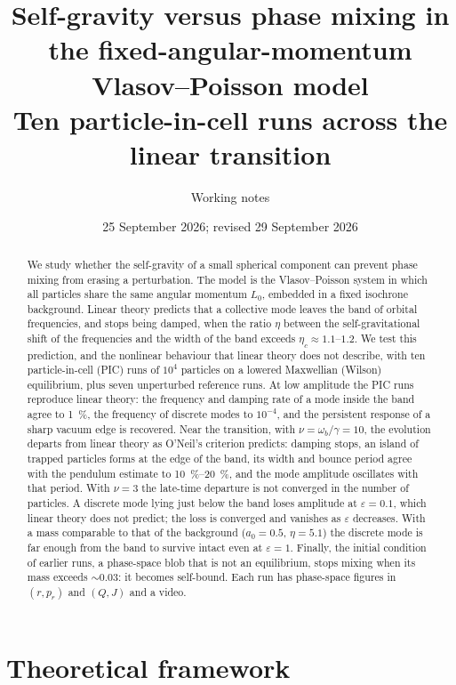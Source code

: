 \documentclass[11pt,a4paper]{article}
\title{Self-gravity versus phase mixing in the fixed-angular-momentum\\
       Vlasov--Poisson model\\[0.3em]
       \large Ten particle-in-cell runs across the linear transition}
\author{Working notes}
\date{25 September 2026; revised 29 September 2026}
\begin{document}
\maketitle

\begin{abstract}
We study whether the self-gravity of a small spherical component can prevent phase
mixing from erasing a perturbation. The model is the Vlasov--Poisson system in which
all particles share the same angular momentum $L_0$, embedded in a fixed isochrone
background. Linear theory predicts that a collective mode leaves the band of orbital
frequencies, and stops being damped, when the ratio $\eta$ between the
self-gravitational shift of the frequencies and the width of the band exceeds
$\eta_c\approx1.1$--$1.2$. We test this prediction, and the nonlinear behaviour that
linear theory does not describe, with ten particle-in-cell (PIC) runs of $10^4$
particles on a lowered Maxwellian (Wilson) equilibrium, plus seven unperturbed
reference runs. At low amplitude the PIC runs reproduce linear theory: the frequency
and damping rate of a mode inside the band agree to \SI{1}{\%}, the frequency of
discrete modes to $10^{-4}$, and the persistent response of a sharp vacuum edge is
recovered. Near the transition, with $\nu=\omega_b/\gamma=10$, the evolution departs
from linear theory as O'Neil's criterion predicts: damping stops, an island of trapped
particles forms at the edge of the band, its width and bounce period agree with the
pendulum estimate to \SIrange{10}{20}{\%}, and the mode amplitude oscillates with
that period. With $\nu=3$ the late-time departure is not converged in the number of
particles. A discrete mode lying just below the band loses amplitude at
$\varepsilon=0.1$, which linear theory does not predict; the loss is converged and
vanishes as $\varepsilon$ decreases. With a mass comparable to that of the background
($a_0=0.5$, $\eta=5.1$) the discrete mode is far enough from the band to survive
intact even at $\varepsilon=1$. Finally, the initial condition of earlier runs, a
phase-space blob that is not an equilibrium, stops mixing when its mass exceeds
$\sim0.03$: it becomes self-bound. Each run has phase-space figures in $(r,p_r)$ and
$(Q,J)$ and a video.
\end{abstract}

\section{Theoretical framework}
\label{sec:teoria}
\end{document}
